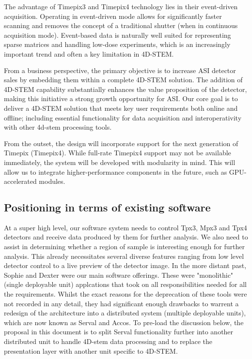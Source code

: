 \documentclass[10pt]{article}
\begin{document}
    The advantage of Timepix3 and Timepix4 technology lies in their event-driven acquisition. Operating in event-driven mode allows for significantly faster scanning and removes the concept of a traditional shutter (when in continuous acquisition mode). Event-based data is naturally well suited for representing sparse matrices and handling low-dose experiments, which is an increasingly important trend and often a key limitation in 4D-STEM.

    From a business perspective, the primary objective is to increase ASI detector sales by embedding them within a complete 4D-STEM solution. The addition of 4D-STEM capability substantially enhances the value proposition of the detector, making this initiative a strong growth opportunity for ASI. Our core goal is to deliver a 4D-STEM solution that meets key user requirements both online and offline; including essential functionality for data acquisition and interoperativity with other 4d-stem processing tools.

    From the outset, the design will incorporate support for the next generation of Timepix (Timepix4). While full-rate Timepix4 support may not be available immediately, the system will be developed with modularity in mind. This will allow us to integrate higher-performance components in the future, such as GPU-accelerated modules.

    \subsection{Positioning in terms of existing software}
    At a super high level, our software system needs to control Tpx3, Mpx3 and Tpx4 detectors and receive data produced by them for further analysis. We also need to assist in determining whether a region of sample is interesting enough for further analysis. This already necessitates several diverse features ranging from low level detector control to a live preview of the detector image. In the more distant past, Sophie and Dexter were our main software offerings. These were "monolithic" (single deployable unit) applcations that took on all responsibilities needed for all the requirements. Whilst the exact reasons for the deprecation of these tools were not recorded in any detail, they had significant enough drawbacks to warrent a redesign of the architecture into a distributed system (multiple deployable units), which are now known as Serval and Accos. To pre-load the discussion below, the proposal in this document is to split Serval functionality further into another distributed unit to handle 4D-stem data processing and to replace the presentation layer with another unit specific to 4D-STEM.
\end{document}
